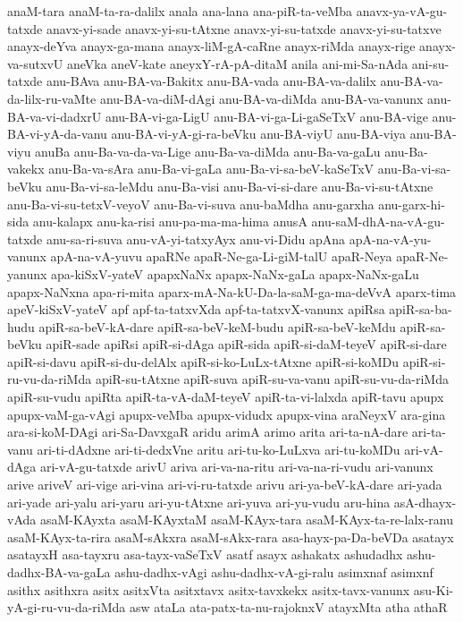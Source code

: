 {anaM-tara
anaM-ta-ra-dalilx
anala
ana-lana
ana-piR-ta-veMba
anavx-ya-vA-gu-tatxde
anavx-yi-sade
anavx-yi-su-tAtxne
anavx-yi-su-tatxde
anavx-yi-su-tatxve
anayx-deYva
anayx-ga-mana
anayx-liM-gA-caRne
anayx-riMda
anayx-rige
anayx-va-sutxvU
aneVka
aneV-kate
aneyxY-rA-pA-ditaM
anila
ani-mi-Sa-nAda
ani-su-tatxde
anu-BAva
anu-BA-va-Bakitx
anu-BA-vada
anu-BA-va-dalilx
anu-BA-va-da-lilx-ru-vaMte
anu-BA-va-diM-dAgi
anu-BA-va-diMda
anu-BA-va-vanunx
anu-BA-va-vi-dadxrU
anu-BA-vi-ga-LigU
anu-BA-vi-ga-Li-gaSeTxV
anu-BA-vige
anu-BA-vi-yA-da-vanu
anu-BA-vi-yA-gi-ra-beVku
anu-BA-viyU
anu-BA-viya
anu-BA-viyu
anuBa
anu-Ba-va-da-va-Lige
anu-Ba-va-diMda
anu-Ba-va-gaLu
anu-Ba-vakekx
anu-Ba-va-sAra
anu-Ba-vi-gaLa
anu-Ba-vi-sa-beV-kaSeTxV
anu-Ba-vi-sa-beVku
anu-Ba-vi-sa-leMdu
anu-Ba-visi
anu-Ba-vi-si-dare
anu-Ba-vi-su-tAtxne
anu-Ba-vi-su-tetxV-veyoV
anu-Ba-vi-suva
anu-baMdha
anu-garxha
anu-garx-hi-sida
anu-kalapx
anu-ka-risi
anu-pa-ma-ma-hima
anusA
anu-saM-dhA-na-vA-gu-tatxde
anu-sa-ri-suva
anu-vA-yi-tatxyAyx
anu-vi-Didu
apAna
apA-na-vA-yu-vanunx
apA-na-vA-yuvu
apaRNe
apaR-Ne-ga-Li-giM-talU
apaR-Neya
apaR-Ne-yanunx
apa-kiSxV-yateV
apapxNaNx
apapx-NaNx-gaLa
apapx-NaNx-gaLu
apapx-NaNxna
apa-ri-mita
aparx-mA-Na-kU-Da-la-saM-ga-ma-deVvA
aparx-tima
apeV-kiSxV-yateV
apf
apf-ta-tatxvXda
apf-ta-tatxvX-vanunx
apiRsa
apiR-sa-ba-hudu
apiR-sa-beV-kA-dare
apiR-sa-beV-keM-budu
apiR-sa-beV-keMdu
apiR-sa-beVku
apiR-sade
apiRsi
apiR-si-dAga
apiR-sida
apiR-si-daM-teyeV
apiR-si-dare
apiR-si-davu
apiR-si-du-delAlx
apiR-si-ko-LuLx-tAtxne
apiR-si-koMDu
apiR-si-ru-vu-da-riMda
apiR-su-tAtxne
apiR-suva
apiR-su-va-vanu
apiR-su-vu-da-riMda
apiR-su-vudu
apiRta
apiR-ta-vA-daM-teyeV
apiR-ta-vi-lalxda
apiR-tavu
apupx
apupx-vaM-ga-vAgi
apupx-veMba
apupx-vidudx
apupx-vina
araNeyxV
ara-gina
ara-si-koM-DAgi
ari-Sa-DavxgaR
aridu
arimA
arimo
arita
ari-ta-nA-dare
ari-ta-vanu
ari-ti-dAdxne
ari-ti-dedxVne
aritu
ari-tu-ko-LuLxva
ari-tu-koMDu
ari-vA-dAga
ari-vA-gu-tatxde
arivU
ariva
ari-va-na-ritu
ari-va-na-ri-vudu
ari-vanunx
arive
ariveV
ari-vige
ari-vina
ari-vi-ru-tatxde
arivu
ari-ya-beV-kA-dare
ari-yada
ari-yade
ari-yalu
ari-yaru
ari-yu-tAtxne
ari-yuva
ari-yu-vudu
aru-hina
asA-dhayx-vAda
asaM-KAyxta
asaM-KAyxtaM
asaM-KAyx-tara
asaM-KAyx-ta-re-lalx-ranu
asaM-KAyx-ta-rira
asaM-sAkxra
asaM-sAkx-rara
asa-hayx-pa-Da-beVDa
asatayx
asatayxH
asa-tayxru
asa-tayx-vaSeTxV
asatf
asayx
ashakatx
ashudadhx
ashu-dadhx-BA-va-gaLa
ashu-dadhx-vAgi
ashu-dadhx-vA-gi-ralu
asimxnaf
asimxnf
asithx
asithxra
asitx
asitxVta
asitxtavx
asitx-tavxkekx
asitx-tavx-vanunx
asu-Ki-yA-gi-ru-vu-da-riMda
asw
ataLa
ata-patx-ta-nu-rajoknxV
atayxMta
atha
athaR
}
